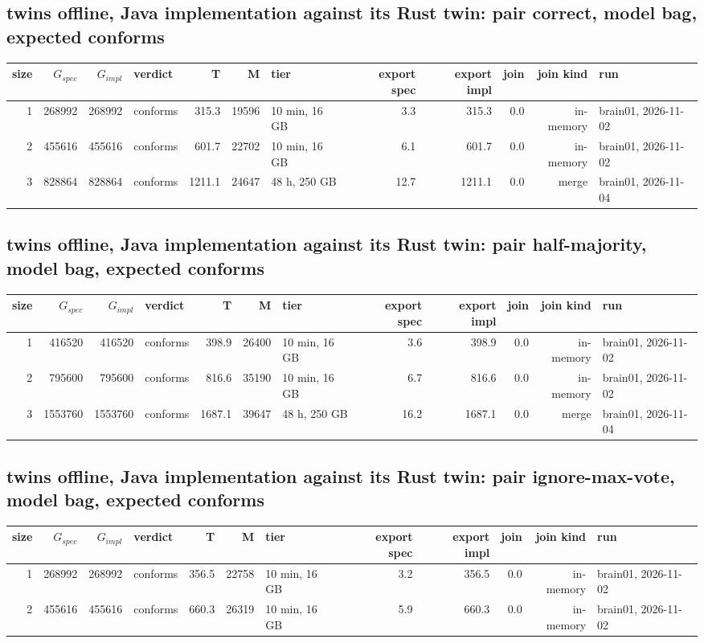 \documentclass[10pt]{article}
\begin{document}
\subsection*{twins offline, Java implementation against its Rust twin: pair \textsf{correct}, model bag, expected conforms}
\begin{longtable}{@{}rrrlrrlrrrrl@{}}
\toprule
size & $G_{\mathit{spec}}$ & $G_{\mathit{impl}}$ & verdict & T & M & tier & export spec & export impl & join & join kind & run \\
\midrule
\endhead
\color{red} 1 & 268992 & 268992 & conforms & 315.3 & 19596 & 10 min, 16 GB & 3.3 & 315.3 & 0.0 & in-memory & brain01, 2026-11-02 \\
\color{red} 2 & 455616 & 455616 & conforms & 601.7 & 22702 & 10 min, 16 GB & 6.1 & 601.7 & 0.0 & in-memory & brain01, 2026-11-02 \\
\color{blue} 3 & 828864 & 828864 & conforms & 1211.1 & 24647 & 48 h, 250 GB & 12.7 & 1211.1 & 0.0 & merge & brain01, 2026-11-04 \\
\bottomrule
\end{longtable}
\subsection*{twins offline, Java implementation against its Rust twin: pair \textsf{half-majority}, model bag, expected conforms}
\begin{longtable}{@{}rrrlrrlrrrrl@{}}
\toprule
size & $G_{\mathit{spec}}$ & $G_{\mathit{impl}}$ & verdict & T & M & tier & export spec & export impl & join & join kind & run \\
\midrule
\endhead
\color{red} 1 & 416520 & 416520 & conforms & 398.9 & 26400 & 10 min, 16 GB & 3.6 & 398.9 & 0.0 & in-memory & brain01, 2026-11-02 \\
\color{red} 2 & 795600 & 795600 & conforms & 816.6 & 35190 & 10 min, 16 GB & 6.7 & 816.6 & 0.0 & in-memory & brain01, 2026-11-02 \\
\color{blue} 3 & 1553760 & 1553760 & conforms & 1687.1 & 39647 & 48 h, 250 GB & 16.2 & 1687.1 & 0.0 & merge & brain01, 2026-11-04 \\
\bottomrule
\end{longtable}
\subsection*{twins offline, Java implementation against its Rust twin: pair \textsf{ignore-max-vote}, model bag, expected conforms}
\begin{longtable}{@{}rrrlrrlrrrrl@{}}
\toprule
size & $G_{\mathit{spec}}$ & $G_{\mathit{impl}}$ & verdict & T & M & tier & export spec & export impl & join & join kind & run \\
\midrule
\endhead
\color{red} 1 & 268992 & 268992 & conforms & 356.5 & 22758 & 10 min, 16 GB & 3.2 & 356.5 & 0.0 & in-memory & brain01, 2026-11-02 \\
\color{red} 2 & 455616 & 455616 & conforms & 660.3 & 26319 & 10 min, 16 GB & 5.9 & 660.3 & 0.0 & in-memory & brain01, 2026-11-02 \\
\bottomrule
\end{longtable}
\end{document}
